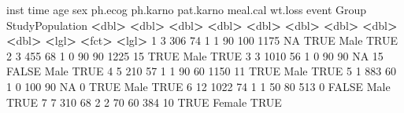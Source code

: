 \documentclass[
]{article}
\newenvironment{Shaded}{\begin{snugshade}}{\end{snugshade}}
\newcommand{\ConstantTok}[1]{\textcolor[rgb]{0.56,0.35,0.01}{#1}}
\newcommand{\DecValTok}[1]{\textcolor[rgb]{0.00,0.00,0.81}{#1}}
\newcommand{\ErrorTok}[1]{\textcolor[rgb]{0.64,0.00,0.00}{\textbf{#1}}}
\newcommand{\NormalTok}[1]{#1}
\newcommand{\SpecialCharTok}[1]{\textcolor[rgb]{0.81,0.36,0.00}{\textbf{#1}}}
\begin{document}
\begin{Shaded}
\begin{Highlighting}[]
\NormalTok{    inst  time   age   sex ph.ecog ph.karno pat.karno meal.cal wt.loss event Group  StudyPopulation}
   \SpecialCharTok{\textless{}}\NormalTok{dbl}\SpecialCharTok{\textgreater{}} \ErrorTok{\textless{}}\NormalTok{dbl}\SpecialCharTok{\textgreater{}} \ErrorTok{\textless{}}\NormalTok{dbl}\SpecialCharTok{\textgreater{}} \ErrorTok{\textless{}}\NormalTok{dbl}\SpecialCharTok{\textgreater{}}   \ErrorTok{\textless{}}\NormalTok{dbl}\SpecialCharTok{\textgreater{}}    \ErrorTok{\textless{}}\NormalTok{dbl}\SpecialCharTok{\textgreater{}}     \ErrorTok{\textless{}}\NormalTok{dbl}\SpecialCharTok{\textgreater{}}    \ErrorTok{\textless{}}\NormalTok{dbl}\SpecialCharTok{\textgreater{}}   \ErrorTok{\textless{}}\NormalTok{dbl}\SpecialCharTok{\textgreater{}} \ErrorTok{\textless{}}\NormalTok{lgl}\SpecialCharTok{\textgreater{}} \ErrorTok{\textless{}}\NormalTok{fct}\SpecialCharTok{\textgreater{}}  \ErrorTok{\textless{}}\NormalTok{lgl}\SpecialCharTok{\textgreater{}}          
 \DecValTok{1}     \DecValTok{3}   \DecValTok{306}    \DecValTok{74}     \DecValTok{1}       \DecValTok{1}       \DecValTok{90}       \DecValTok{100}     \DecValTok{1175}      \ConstantTok{NA} \ConstantTok{TRUE}\NormalTok{  Male   }\ConstantTok{TRUE}           
 \DecValTok{2}     \DecValTok{3}   \DecValTok{455}    \DecValTok{68}     \DecValTok{1}       \DecValTok{0}       \DecValTok{90}        \DecValTok{90}     \DecValTok{1225}      \DecValTok{15} \ConstantTok{TRUE}\NormalTok{  Male   }\ConstantTok{TRUE}           
 \DecValTok{3}     \DecValTok{3}  \DecValTok{1010}    \DecValTok{56}     \DecValTok{1}       \DecValTok{0}       \DecValTok{90}        \DecValTok{90}       \ConstantTok{NA}      \DecValTok{15} \ConstantTok{FALSE}\NormalTok{ Male   }\ConstantTok{TRUE}           
 \DecValTok{4}     \DecValTok{5}   \DecValTok{210}    \DecValTok{57}     \DecValTok{1}       \DecValTok{1}       \DecValTok{90}        \DecValTok{60}     \DecValTok{1150}      \DecValTok{11} \ConstantTok{TRUE}\NormalTok{  Male   }\ConstantTok{TRUE}           
 \DecValTok{5}     \DecValTok{1}   \DecValTok{883}    \DecValTok{60}     \DecValTok{1}       \DecValTok{0}      \DecValTok{100}        \DecValTok{90}       \ConstantTok{NA}       \DecValTok{0} \ConstantTok{TRUE}\NormalTok{  Male   }\ConstantTok{TRUE}           
 \DecValTok{6}    \DecValTok{12}  \DecValTok{1022}    \DecValTok{74}     \DecValTok{1}       \DecValTok{1}       \DecValTok{50}        \DecValTok{80}      \DecValTok{513}       \DecValTok{0} \ConstantTok{FALSE}\NormalTok{ Male   }\ConstantTok{TRUE}           
 \DecValTok{7}     \DecValTok{7}   \DecValTok{310}    \DecValTok{68}     \DecValTok{2}       \DecValTok{2}       \DecValTok{70}        \DecValTok{60}      \DecValTok{384}      \DecValTok{10} \ConstantTok{TRUE}\NormalTok{  Female }\ConstantTok{TRUE}           

\end{Highlighting}
\end{Shaded}
\end{document}
